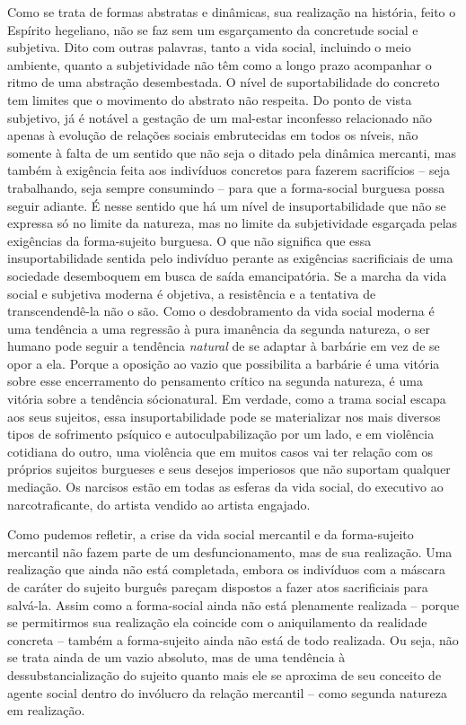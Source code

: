 Como se trata de formas abstratas e dinâmicas, sua realização na
história, feito o Espírito hegeliano, não se faz sem um esgarçamento da
concretude social e subjetiva. Dito com outras palavras, tanto a vida
social, incluindo o meio ambiente, quanto a subjetividade não têm como a
longo prazo acompanhar o ritmo de uma abstração desembestada. O nível de
suportabilidade do concreto tem limites que o movimento do abstrato não
respeita. Do ponto de vista subjetivo, já é notável a gestação de um
mal-estar inconfesso relacionado não apenas à evolução de relações
sociais embrutecidas em todos os níveis, não somente à falta de um
sentido que não seja o ditado pela dinâmica mercanti, mas também à
exigência feita aos indivíduos concretos para fazerem sacrifícios --
seja trabalhando, seja sempre consumindo -- para que a forma-social
burguesa possa seguir adiante. É nesse sentido que há um nível de
insuportabilidade que não se expressa só no limite da natureza, mas no
limite da subjetividade esgarçada pelas exigências da forma-sujeito
burguesa. O que não significa que essa insuportabilidade sentida pelo
indivíduo perante as exigências sacrificiais de uma sociedade
desemboquem em busca de saída emancipatória. Se a marcha da vida social
e subjetiva moderna é objetiva, a resistência e a tentativa de
transcendendê-la não o são. Como o desdobramento da vida social moderna
é uma tendência a uma regressão à pura imanência da segunda natureza, o
ser humano pode seguir a tendência \emph{natural} de se adaptar à
barbárie em vez de se opor a ela. Porque a oposição ao vazio que
possibilita a barbárie é uma vitória sobre esse encerramento do
pensamento crítico na segunda natureza, é uma vitória sobre a tendência
sócionatural. Em verdade, como a trama social escapa aos seus sujeitos,
essa insuportabilidade pode se materializar nos mais diversos tipos de
sofrimento psíquico e autoculpabilização por um lado, e em violência
cotidiana do outro, uma violência que em muitos casos vai ter relação
com os próprios sujeitos burgueses e seus desejos imperiosos que não
suportam qualquer mediação. Os narcisos estão em todas as esferas da
vida social, do executivo ao narcotraficante, do artista vendido ao
artista engajado.

Como pudemos refletir, a crise da vida social mercantil e da
forma-sujeito mercantil não fazem parte de um desfuncionamento, mas de
sua realização. Uma realização que ainda não está completada, embora os
indivíduos com a máscara de caráter do sujeito burguês pareçam dispostos
a fazer atos sacrificiais para salvá-la. Assim como a forma-social ainda
não está plenamente realizada -- porque se permitirmos sua realização
ela coincide com o aniquilamento da realidade concreta -- também a
forma-sujeito ainda não está de todo realizada. Ou seja, não se trata
ainda de um vazio absoluto, mas de uma tendência à dessubstancialização
do sujeito quanto mais ele se aproxima de seu conceito de agente social
dentro do invólucro da relação mercantil -- como segunda natureza em
realização.

